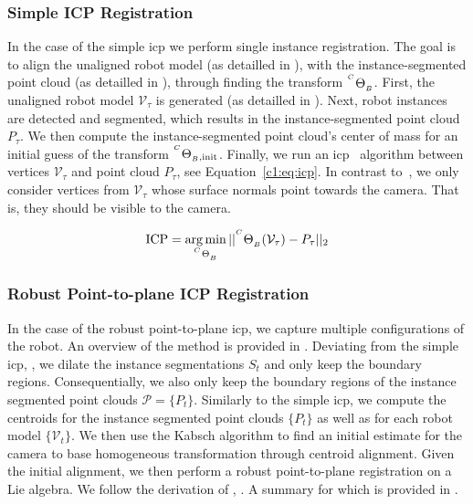\subsubsection{Simple ICP Registration}
\label{c1:sec:simple_icp_registration}
In the case of the simple \acrshort{icp} we perform single instance registration. The goal is to align the unaligned robot model (as detailled in ), with the instance-segmented point cloud (as detailled in ), through finding the transform ${}^{^C}\Theta_{_B}$. First, the unaligned robot model $\mathcal{V}_\tau$ is generated (as detailled in ). Next, robot instances are detected and segmented, which results in the instance-segmented point cloud $P_\tau$. We then compute the instance-segmented point cloud's center of mass for an initial guess of the transform ${}^{^{C}}\Theta_{_B,\text{init}}$. Finally, we run an \acrshort{icp}~\cite{simple_icp} algorithm between vertices $\mathcal{V}_\tau$ and point cloud $P_\tau$, see Equation~\ref{c1:eq:icp}. In contrast to~\cite{simple_icp}, we only consider vertices from $\mathcal{V}_\tau$ whose surface normals point towards the camera. That is, they should be visible to the camera.

\begin{equation}
    \label{c1:eq:icp}
    \text{ICP} = \argmin_{\homogeneous{C}{B}} || \homogeneous{C}{B}(\mathcal{V}_\tau) - P_\tau||_2
\end{equation}

\subsubsection{Robust Point-to-plane ICP Registration}
\label{c1:sec:robust_icp}

In the case of the robust point-to-plane \acrshort{icp}, we capture multiple configurations of the robot. An overview of the method is provided in . Deviating from the simple \acrshort{icp}, , we dilate the instance segmentations $S_t$ and only keep the boundary regions. Consequentially, we also only keep the boundary regions of the instance segmented point clouds $\mathcal{P} = \{P_t\}$. Similarly to the simple \acrshort{icp}, we compute the centroids for the instance segmented point clouds $\{P_t\}$ as well as for each robot model $\{\mathcal{V}_t\}$. We then use the Kabsch algorithm to find an initial estimate for the camera to base homogeneous transformation through centroid alignment. Given the initial alignment, we then perform a robust point-to-plane registration on a Lie algebra. We follow the derivation of , . A summary for which is provided in .

